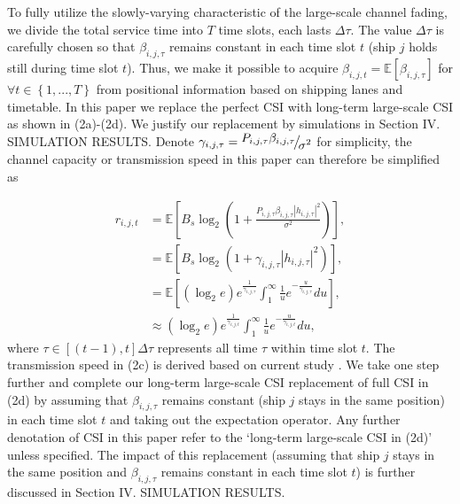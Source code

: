 \documentclass[conference]{IEEEtran}
\begin{document}
To fully utilize the slowly-varying characteristic of the large-scale channel fading, we divide the total service time into $T$ time slots, each lasts $\Delta \tau$. The value $\Delta \tau$ is carefully chosen so that $\beta _{i,j,\tau }$ remains constant in each time slot $t$ (ship $j$ holds still during time slot $t$). Thus, we make it possible to acquire $\beta _{i,j,t} = \mathbb{E} \left [ {\beta _{i,j,\tau }} \right ]$ for $\forall t \in \left\{ {1,...,T} \right\}$ from positional information based on shipping lanes and timetable. 
In this paper we replace the perfect CSI with long-term large-scale CSI as shown in (2a)-(2d). We justify our replacement by simulations in Section IV. SIMULATION RESULTS. Denote ${\gamma _{i,j,\tau }} = {\raise0.7ex\hbox{${{P_{i,j,\tau }}{\beta _{i,j,\tau }}}$} \!\mathord{\left/
 {\vphantom {{{P_{i,j,\tau }}{\beta _{i,j,\tau }}} {{\sigma ^2}}}}\right.\kern-\nulldelimiterspace}
\!\lower0.7ex\hbox{${{\sigma ^2}}$}}$ for simplicity, the channel capacity or transmission speed in this paper can therefore be simplified as

\begin{subequations}
\begin{align}
{r_{i,j,t}} & = {\mathbb{E}}\left [ {{B_s}{{\log }_2}\left( {1 + \frac{{{P_{i,j,\tau }}{\beta _{i,j,\tau }}{{\left| {{h_{i,j,\tau }}} \right|}^2}}}{{{\sigma ^2}}}} \right)} \right ] ,\\
& = {\mathbb{E}}\left [  {B_s}{\log }_2 \left( {1 + {\gamma _{i,j,\tau }}{{\left| {{h_{i,j,\tau }}} \right|}^2}} \right)  \right ] ,\\
& = {\mathbb{E}}\left [  \left( {{{\log }_2}e} \right){e^{\frac{1}{{{\gamma _{i,j,\tau }}}}}}\int_1^\infty  {\frac{1}{u}{e^{ - \frac{u}{{{\gamma _{i,j,\tau }}}}}}du} \right ] ,\\
&  \approx \left( {{{\log }_2}e} \right){e^{\frac{1}{{{\gamma _{i,j,t}}}}}}\int_1^\infty  {\frac{1}{u}{e^{ - \frac{u}{{{\gamma _{i,j,t}}}}}}du} ,
\end{align}
\end{subequations}
where $\tau  \in \left[ {\left( {t - 1} \right),t} \right]\Delta \tau$ represents all time $\tau $ within time slot $t$. 
The transmission speed in (2c) is derived based on current study \cite{p41}. We take one step further and complete our long-term large-scale CSI replacement of full CSI in (2d) by assuming that $\beta _{i,j,\tau }$ remains constant (ship $j$ stays in the same position) in each time slot $t$ and taking out the expectation operator. Any further denotation of CSI in this paper refer to the `long-term large-scale CSI in (2d)' unless specified. The impact of this replacement (assuming that ship $j$ stays in the same position and $\beta _{i,j,\tau }$ remains constant in each time slot $t$) is further discussed in Section IV. SIMULATION RESULTS. 
\end{document}
